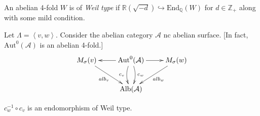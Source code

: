 \begin{definition}
\label{definition-Weil-type}
An abelian 4-fold $W$ is of {\it Weil type}
if $\mathbb{R}(\sqrt{-d}) \hookrightarrow
\text{End}_{\mathbb{Q}}(W)$ for
$d\in\mathbb{Z}_+$ along with some mild
condition.
\end{definition}

Let $\Lambda=\left\langle{}v,w\right\rangle{}$. Consider the
abelian category $\mathcal{A}$ nc abelian
surface. [In fact,
$\text{Aut}^0(\mathcal{A})$ is an abelian
4-fold.]
$$
\xymatrix{
M_\sigma(v)\ar[dr]_{alb_v}&
\text{Aut}^0(\mathcal{A})\ar[l]\ar[r]
\ar@/^{.5pc}/[d]^{c_w}\ar@/^{-0.5pc}/[d]
_{c_v}
& M_\sigma(w)\ar[dl]^{alb_w}\\
&\text{Alb}(\mathcal{A})
}
$$
\begin{theorem}
\label{theorem-duplicate-2}
$c_w^{-1} \circ c_v$ is an endomorphism of
Weil type.
\end{theorem}

